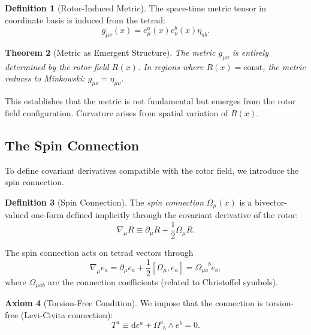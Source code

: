 \documentclass[11pt,a4paper]{article}
\numberwithin{equation}{section}
\theoremstyle{plain}
\newtheorem{theorem}{Theorem}[section]
\theoremstyle{definition}
\newtheorem{definition}[theorem]{Definition}
\newtheorem{axiom}[theorem]{Axiom}
\theoremstyle{remark}
\newcommand{\dd}{\mathrm{d}}
\begin{document}
\begin{definition}[Rotor-Induced Metric]
The space-time metric tensor in coordinate basis is induced from the tetrad:
\begin{equation}
g_{\mu\nu}(x) = e_\mu^a(x) e_\nu^b(x) \eta_{ab}.
\label{eq:induced-metric}
\end{equation}
\end{definition}

\begin{theorem}[Metric as Emergent Structure]
The metric $g_{\mu\nu}$ is entirely determined by the rotor field $R(x)$. In regions where $R(x) = \mathrm{const}$, the metric reduces to Minkowski: $g_{\mu\nu} = \eta_{\mu\nu}$.
\end{theorem}

This establishes that the metric is not fundamental but emerges from the rotor field configuration. Curvature arises from spatial variation of $R(x)$.

\subsection{The Spin Connection}

To define covariant derivatives compatible with the rotor field, we introduce the spin connection.

\begin{definition}[Spin Connection]
The \emph{spin connection} $\Omega_\mu(x)$ is a bivector-valued one-form defined implicitly through the covariant derivative of the rotor:
\begin{equation}
\nabla_\mu R \equiv \partial_\mu R + \frac{1}{2}\Omega_\mu R.
\label{eq:spin-connection-def}
\end{equation}
\end{definition}

The spin connection acts on tetrad vectors through
\begin{equation}
\nabla_\mu e_a = \partial_\mu e_a + \frac{1}{2}[\Omega_\mu, e_a] = \Omega_{\mu a}^{\phantom{\mu a}b} e_b,
\label{eq:covariant-tetrad}
\end{equation}
where $\Omega_{\mu ab}$ are the connection coefficients (related to Christoffel symbols).

\begin{axiom}[Torsion-Free Condition]
We impose that the connection is torsion-free (Levi-Civita connection):
\begin{equation}
T^a \equiv \dd e^a + \Omega^a_{\phantom{a}b} \wedge e^b = 0.
\label{eq:torsion-free}
\end{equation}
\end{axiom}
\end{document}

